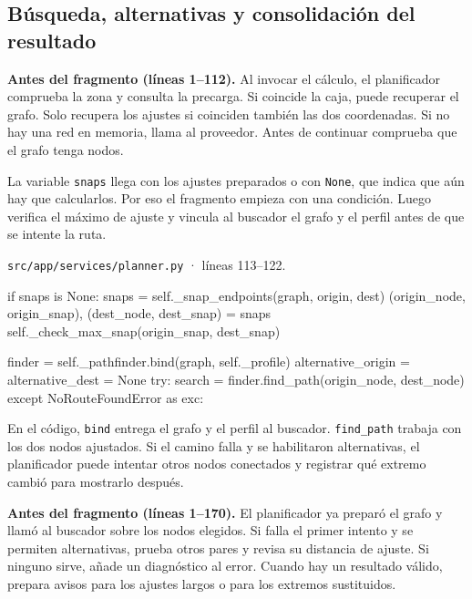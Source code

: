 \documentclass[11pt,a4paper]{article}
\begin{document}
\subsection{Búsqueda, alternativas y consolidación del resultado}

\textbf{Antes del fragmento (líneas 1--112).} Al invocar el cálculo, el planificador comprueba la zona y consulta la precarga. Si coincide la caja, puede recuperar el grafo. Solo recupera los ajustes si coinciden también las dos coordenadas. Si no hay una red en memoria, llama al proveedor. Antes de continuar comprueba que el grafo tenga nodos.

La variable \texttt{snaps} llega con los ajustes preparados o con \texttt{None}, que indica que aún hay que calcularlos. Por eso el fragmento empieza con una condición. Luego verifica el máximo de ajuste y vincula al buscador el grafo y el perfil antes de que se intente la ruta.

\par\medskip
\noindent\begin{minipage}{\linewidth}
{\footnotesize\nolinkurl{src/app/services/planner.py} · líneas 113--122.\par}
\nopagebreak[4]
\begin{Codigo}[firstnumber=113]
        if snaps is None:
            snaps = self._snap_endpoints(graph, origin, dest)
        (origin_node, origin_snap), (dest_node, dest_snap) = snaps
        self._check_max_snap(origin_snap, dest_snap)

        finder = self._pathfinder.bind(graph, self._profile)
        alternative_origin = alternative_dest = None
        try:
            search = finder.find_path(origin_node, dest_node)
        except NoRouteFoundError as exc:
\end{Codigo}
\end{minipage}\par

En el código, \texttt{bind} entrega el grafo y el perfil al buscador. \texttt{find\_path} trabaja con los dos nodos ajustados. Si el camino falla y se habilitaron alternativas, el planificador puede intentar otros nodos conectados y registrar qué extremo cambió para mostrarlo después.

\textbf{Antes del fragmento (líneas 1--170).} El planificador ya preparó el grafo y llamó al buscador sobre los nodos elegidos. Si falla el primer intento y se permiten alternativas, prueba otros pares y revisa su distancia de ajuste. Si ninguno sirve, añade un diagnóstico al error. Cuando hay un resultado válido, prepara avisos para los ajustes largos o para los extremos sustituidos.
\end{document}
